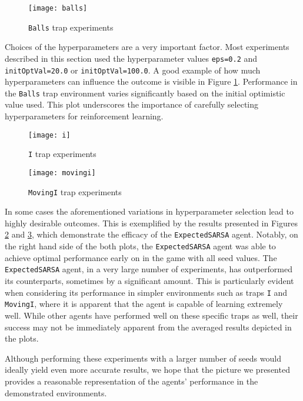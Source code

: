 \begin{figure}[h]
    \centering
    \texttt{[image: balls]}
    \caption{\texttt{Balls} trap experiments}
    \label{fig:balls_eg}
\end{figure}

Choices of the hyperparameters are a very important factor. Most experiments described in this section used the hyperparameter values \texttt{eps=0.2} and \texttt{initOptVal=20.0} or \texttt{initOptVal=100.0}. A good example of how much hyperparameters can influence the outcome is visible in Figure \ref{fig:balls_eg}. Performance in the \texttt{Balls} trap environment varies significantly based on the initial optimistic value used. This plot underscores the importance of carefully selecting hyperparameters for reinforcement learning.

\begin{figure}[h]
    \centering
    \texttt{[image: i]}
    \caption{\texttt{I} trap experiments}
    \label{fig:i_eg}
\end{figure}

\begin{figure}[h]
    \centering
    \texttt{[image: movingi]}
    \caption{\texttt{MovingI} trap experiments}
    \label{fig:movingi_eg}
\end{figure}

In some cases the aforementioned variations in hyperparameter selection lead to highly desirable outcomes. This is exemplified by the results presented in Figures \ref{fig:i_eg} and \ref{fig:movingi_eg}, which demonstrate the efficacy of the \texttt{ExpectedSARSA} agent. Notably, on the right hand side of the both plots, the \texttt{ExpectedSARSA} agent was able to achieve optimal performance early on in the game with all seed values. The \texttt{ExpectedSARSA} agent, in a very large number of experiments, has outperformed its counterparts, sometimes by a significant amount. This is particularly evident when considering its performance in simpler environments such as traps \texttt{I} and \texttt{MovingI}, where it is apparent that the agent is capable of learning extremely well. While other agents have performed well on these specific traps as well, their success may not be immediately apparent from the averaged results depicted in the plots.

Although performing these experiments with a larger number of seeds would ideally yield even more accurate results, we hope that the picture we presented provides a reasonable representation of the agents' performance in the demonstrated environments.

